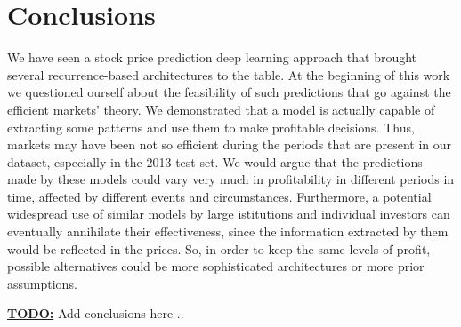 \documentclass{article}
\begin{document}
\section{Conclusions}

We have seen a stock price prediction deep learning approach that brought several
recurrence-based architectures to the table. At the beginning of this work we questioned
ourself about the feasibility of such predictions that go against the efficient markets'
theory. We demonstrated that a model is actually capable of extracting some patterns and
use them to make profitable decisions. Thus, markets may have been not so efficient during
the periods that are present in our dataset, especially in the 2013 test set. We would
argue that the predictions made by these models could vary very much in profitability
in different periods in time, affected by different events and circumstances. Furthermore,
a potential widespread use of similar models by large istitutions and individual investors
can eventually annihilate their effectiveness, since the information extracted by them would
be reflected in the prices. So, in order to keep the same levels of profit, possible
alternatives could be more sophisticated architectures or more prior assumptions.  

\underline{\textbf{TODO:}} Add conclusions here ..




\end{document}
